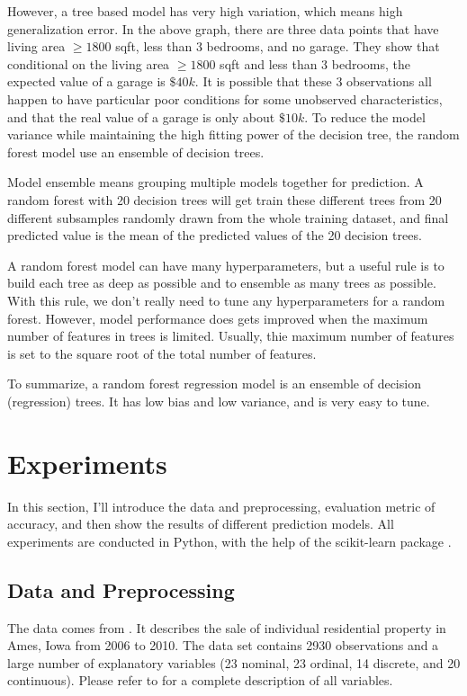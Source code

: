 \documentclass[a4paper]{article}
\begin{document}
However, a tree based model has very high variation, which means high generalization error. In the above graph, there are three data points that have living area $\geq 1800$ sqft, less than 3 bedrooms, and no garage.  They show that conditional on the living area $\geq 1800$ sqft and less than 3 bedrooms, the expected value of a garage is $\$40k$. It is possible that these 3 observations all happen to have particular poor conditions for some unobserved characteristics, and that the real value of a garage is only about $\$10k$. To reduce the model variance while maintaining the high fitting power of the decision tree, the random forest model use an ensemble of decision trees.

Model ensemble means grouping multiple models together for prediction. A random forest with 20 decision trees will get train these different trees from 20 different subsamples randomly drawn from the whole training dataset, and final predicted value is the mean of the predicted values of the 20 decision trees. 

A random forest model can have many hyperparameters, but a useful rule is to build each tree as deep as possible and to ensemble as many trees as possible. With this rule, we don't really need to tune any hyperparameters for a random forest. However, model performance does gets improved when the maximum number of features in trees is limited. Usually, thie maximum number of features is set to the square root of the total number of features.

To summarize, a random forest regression model is an ensemble of decision (regression) trees. It has low bias and low variance, and is very easy to tune.

\section{Experiments}
In this section, I'll introduce the data and preprocessing, evaluation metric of accuracy, and then show the results of different prediction models. All experiments are conducted in Python, with the help of the scikit-learn package \citep{scikit-learn}.

\subsection{Data and Preprocessing}
The data comes from \cite{de2011ames}. It describes the sale of individual residential property in Ames, Iowa from 2006 to 2010. The data set contains 2930 observations and a large number of explanatory variables (23 nominal, 23 ordinal, 14 discrete, and 20 continuous). Please refer to \cite{de2011ames} for a complete description of all variables. 
\end{document}
